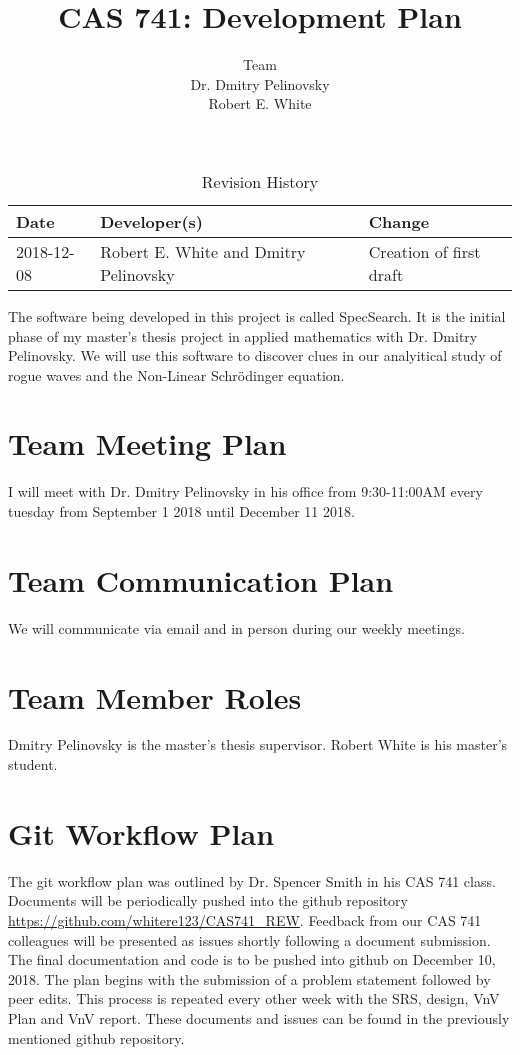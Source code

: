 \documentclass{article}
\title{CAS 741: Development Plan\\ \progname}
\author{Team 
		\\ Dr. Dmitry Pelinovsky
		\\ Robert E. White
}
\date{}
\newcommand{\progname}{SpecSearch}
\begin{document}
\begin{table}[hp]
\caption{Revision History} \label{TblRevisionHistory}
\begin{tabularx}{\textwidth}{llX}
\toprule
\textbf{Date} & \textbf{Developer(s)} & \textbf{Change}\\
\midrule
2018-12-08 & Robert E. White and Dmitry Pelinovsky & Creation of first draft\\
\bottomrule
\end{tabularx}
\end{table}

\newpage

\maketitle

The software being developed in this project is called \progname. It is the 
initial phase of my master's thesis project in applied mathematics with Dr. 
Dmitry Pelinovsky. We will use this software to discover clues in our 
analyitical study of rogue waves and the Non-Linear Schr\"{o}dinger equation.

\section{Team Meeting Plan} 

I will meet with Dr. Dmitry Pelinovsky in his office from 9:30-11:00AM every 
tuesday from September 1 2018 until December 11 2018. 

\section{Team Communication Plan} 

We will communicate via email and in person during our weekly meetings. 

\section{Team Member Roles} 

Dmitry Pelinovsky is the master's thesis supervisor. Robert White is his 
master's student.

\section{Git Workflow Plan} 

The git workflow plan was outlined by Dr. Spencer Smith in his CAS 741 class. 
Documents will be periodically pushed into the github repository 
\url{https://github.com/whitere123/CAS741_REW}. Feedback from our CAS 741 
colleagues 
will be presented as issues shortly following a document submission. The final 
documentation and code is to be pushed into github on December 10, 2018. The 
plan begins with the submission of a problem statement followed by peer edits. 
This process is repeated every other week with the SRS, design, VnV Plan and 
VnV report. These documents and issues can be found in the previously mentioned 
github repository.
\end{document}
